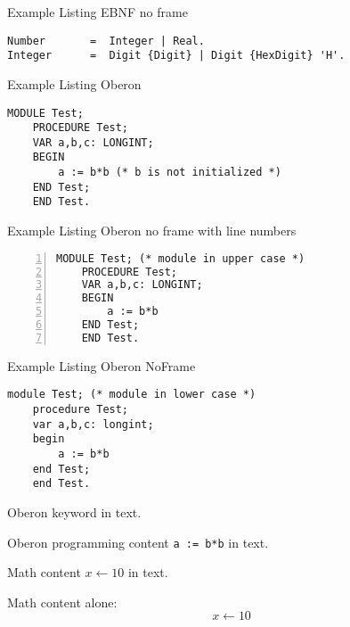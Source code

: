 \documentclass[a4wide,11pt]{article}
\newcommand{\changefont}[3]{\fontfamily{#1}\fontseries{#2}\fontshape{#3}\selectfont}
\newcommand{\kwfont}{\changefont{pcr}{b}{n}}
\newcommand{\kw}[1]{\makebox{\kwfont #1}}
\begin{document}
Example Listing EBNF no frame
\begin{lstlisting}[language=ebnf,frame=none]
Number       =  Integer | Real.
Integer      =  Digit {Digit} | Digit {HexDigit} 'H'.
\end{lstlisting}


Example Listing Oberon
\begin{lstlisting}[language=Oberon]
    MODULE Test;
    PROCEDURE Test;
    VAR a,b,c: LONGINT;
    BEGIN
        a := b*b (* b is not initialized *)
    END Test;
    END Test.
\end{lstlisting}

Example Listing Oberon no frame with line numbers
\begin{lstlisting}[language=Oberon,frame=none,numbers=left]
    MODULE Test; (* module in upper case *)
    PROCEDURE Test;
    VAR a,b,c: LONGINT;
    BEGIN
        a := b*b
    END Test;
    END Test.
\end{lstlisting}

Example Listing Oberon NoFrame
\begin{lstlisting}[language=Oberon,frame=none]
    module Test; (* module in lower case *)
    procedure Test;
    var a,b,c: longint;
    begin
        a := b*b
    end Test;
    end Test.
\end{lstlisting}

Oberon keyword \kw{module} in text.

Oberon programming content \verb+a := b*b+ in text.

Math content $x \leftarrow 10$ in text.

Math content alone:
$$x \leftarrow 10$$
\end{document}

